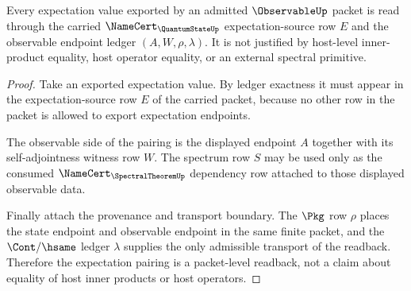 \begin{theorem}
\label{thm:observable-expectation-pairing-boundary}
Every expectation value exported by an admitted $\ObservableUp$ packet is read
through the carried $\NameCert_{\QuantumStateUp}$ expectation-source row $E$
and the observable endpoint ledger $(A,W,\rho,\lambda)$. It is not justified
by host-level inner-product equality, host operator equality, or an external
spectral primitive.
\end{theorem}
\begin{proof}
Take an exported expectation value. By ledger exactness it must appear in the
expectation-source row $E$ of the carried packet, because no other row in the
packet is allowed to export expectation endpoints.

The observable side of the pairing is the displayed endpoint $A$ together
with its self-adjointness witness row $W$. The spectrum row $S$ may be used
only as the consumed $\NameCert_{\SpectralTheoremUp}$ dependency row attached
to those displayed observable data.

Finally attach the provenance and transport boundary. The $\Pkg$ row $\rho$
places the state endpoint and observable endpoint in the same finite packet,
and the $\Cont/\hsame$ ledger $\lambda$ supplies the only admissible transport
of the readback. Therefore the expectation pairing is a packet-level
readback, not a claim about equality of host inner products or host
operators.
\end{proof}

